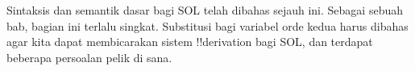 \documentclass[../../../include/open-logic-chapter]{subfiles}
\begin{document}

\begin{editorial}
Sintaksis dan semantik dasar bagi SOL telah dibahas sejauh ini. Sebagai sebuah
bab, bagian ini terlalu singkat. Substitusi bagi variabel orde kedua harus
dibahas agar kita dapat membicarakan sistem !!{derivation} bagi SOL, dan
terdapat beberapa persoalan pelik di sana.
\end{editorial}







\OLEndChapterHook
\end{document}
